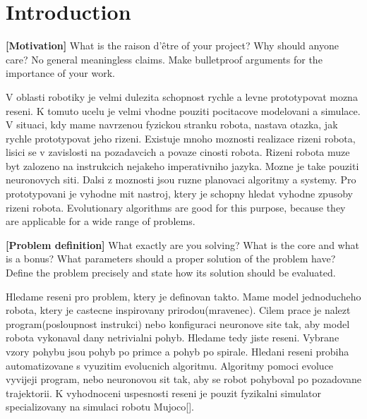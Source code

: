 \documentclass{ExcelAtFIT}
\affiliation{*%
  \href{mailto:herout@fit.vutbr.cz}{herout@fit.vutbr.cz},
  \textit{Faculty of Information Technology, Brno University of Technology}}
\begin{document}
\startdocument



\section{Introduction}

\textbf{[Motivation]} What is the raison d'\^{e}tre of your project? Why should anyone care? No general meaningless claims. Make bulletproof arguments for the importance of your work.

V oblasti robotiky je velmi dulezita schopnost rychle a levne prototypovat mozna reseni.
K tomuto ucelu je velmi vhodne pouziti pocitacove modelovani a simulace.
V situaci, kdy mame navrzenou fyzickou stranku robota, nastava otazka, jak rychle prototypovat jeho rizeni.
Existuje mnoho moznosti realizace rizeni robota, lisici se v zavislosti na pozadavcich a povaze cinosti robota.
Rizeni robota muze byt zalozeno na instrukcich nejakeho imperativniho jazyka.
Mozne je take  pouziti neuronovych siti.
Dalsi z moznosti jsou ruzne planovaci algoritmy a systemy. 
Pro prototypovani je vyhodne mit nastroj, ktery je schopny hledat vyhodne zpusoby rizeni robota.
Evolutionary algorithms are good for this purpose, because they are applicable for a wide range of problems.~\cite{Eiben2015}

\textbf{[Problem definition]} What exactly are you solving? What is the core and what is a bonus? What parameters should a proper solution of the problem have? Define the problem precisely and state how its solution should be evaluated.

Hledame reseni pro problem, ktery je definovan takto.
Mame model jednoducheho robota, ktery je castecne inspirovany prirodou(mravenec). 
Cilem prace je nalezt program(posloupnost instrukci) nebo konfiguraci neuronove site tak, aby model robota vykonaval dany netrivialni pohyb.
Hledame tedy jiste reseni.
Vybrane vzory pohybu jsou pohyb po primce a pohyb po spirale.
Hledani reseni probiha automatizovane s vyuzitim evolucnich algoritmu.
Algoritmy pomoci evoluce vyvijeji program, nebo neuronovou sit tak, aby se robot pohyboval po pozadovane trajektorii.
K vyhodnoceni uspesnosti reseni je pouzit fyzikalni simulator specializovany na simulaci robotu Mujoco[].
\end{document}
